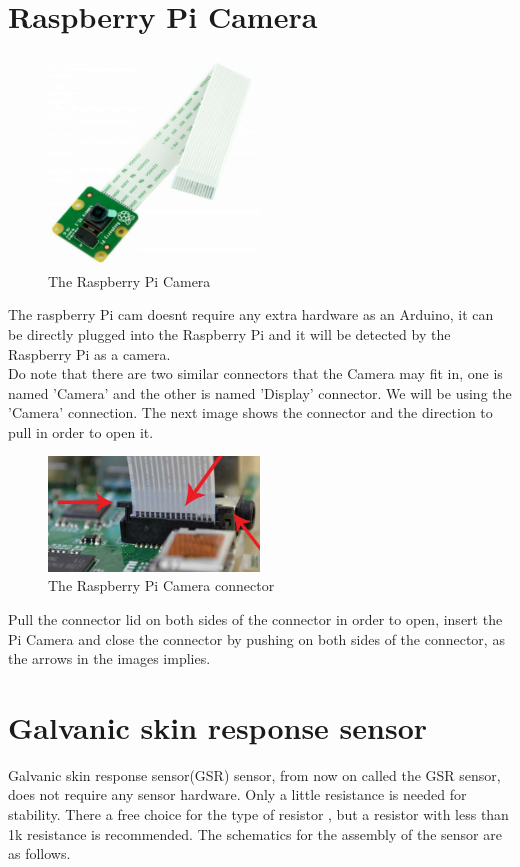 \documentclass{report}
\begin{document}
\chapter{Raspberry Pi Camera}
\begin{figure}[H]
	\centering
\includegraphics[width=0.50\textwidth]{images/Raspberry-Pi-Camera-Board-v2-1.png}
\caption{The Raspberry Pi Camera}	
\end{figure}

The raspberry Pi cam doesnt require any extra hardware as an Arduino, it can be directly plugged into the Raspberry Pi and it will be detected by the Raspberry Pi as a camera. \\
Do note that there are two similar connectors that the Camera may fit in, one is named 'Camera' and the other is named 'Display' connector. We will be using the 'Camera' connection. The next image shows the connector and the direction to pull in order to open it.  

\begin{figure}[H]
	\centering
\includegraphics[width=0.50\textwidth]{images/clips-and-ribbon-cable.jpg}
\caption{The Raspberry Pi Camera connector}	
\end{figure}

Pull the connector lid on both sides of the connector in order to open, insert the Pi Camera and close the connector by pushing on both sides of the connector, as the arrows in the images implies. 

\chapter{Galvanic skin response sensor}
Galvanic skin response sensor(GSR) sensor, from now on called the GSR sensor, does not require any sensor hardware. Only a little resistance is needed for stability. There a free choice for the type of resistor , but a resistor with less than 1k resistance is recommended. The schematics for the assembly of the sensor are as follows. \\
\end{document}
